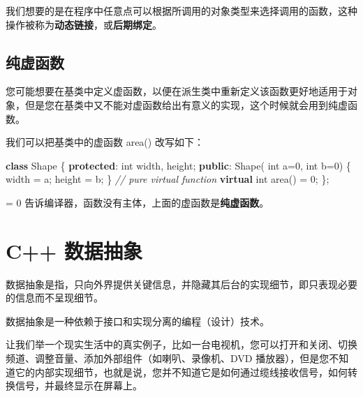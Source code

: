 \documentclass[
]{article}
\newenvironment{Shaded}{}{}
\newcommand{\CommentTok}[1]{\textcolor[rgb]{0.38,0.63,0.69}{\textit{#1}}}
\newcommand{\DataTypeTok}[1]{\textcolor[rgb]{0.56,0.13,0.00}{#1}}
\newcommand{\DecValTok}[1]{\textcolor[rgb]{0.25,0.63,0.44}{#1}}
\newcommand{\KeywordTok}[1]{\textcolor[rgb]{0.00,0.44,0.13}{\textbf{#1}}}
\newcommand{\NormalTok}[1]{#1}
\newcommand{\OperatorTok}[1]{\textcolor[rgb]{0.40,0.40,0.40}{#1}}
\begin{document}
我们想要的是在程序中任意点可以根据所调用的对象类型来选择调用的函数，这种操作被称为\textbf{动态链接}，或\textbf{后期绑定}。

\hypertarget{ux7eafux865aux51fdux6570}{%
\subsection{纯虚函数}\label{ux7eafux865aux51fdux6570}}

您可能想要在基类中定义虚函数，以便在派生类中重新定义该函数更好地适用于对象，但是您在基类中又不能对虚函数给出有意义的实现，这个时候就会用到纯虚函数。

我们可以把基类中的虚函数 area() 改写如下：

\begin{Shaded}
\begin{Highlighting}[]
\KeywordTok{class}\NormalTok{ Shape }\OperatorTok{\{}
   \KeywordTok{protected}\OperatorTok{:}
      \DataTypeTok{int}\NormalTok{ width}\OperatorTok{,}\NormalTok{ height}\OperatorTok{;}
   \KeywordTok{public}\OperatorTok{:}
\NormalTok{      Shape}\OperatorTok{(} \DataTypeTok{int}\NormalTok{ a}\OperatorTok{=}\DecValTok{0}\OperatorTok{,} \DataTypeTok{int}\NormalTok{ b}\OperatorTok{=}\DecValTok{0}\OperatorTok{)}
      \OperatorTok{\{}
\NormalTok{         width }\OperatorTok{=}\NormalTok{ a}\OperatorTok{;}
\NormalTok{         height }\OperatorTok{=}\NormalTok{ b}\OperatorTok{;}
      \OperatorTok{\}}
      \CommentTok{// pure virtual function}
      \KeywordTok{virtual} \DataTypeTok{int}\NormalTok{ area}\OperatorTok{()} \OperatorTok{=} \DecValTok{0}\OperatorTok{;}
\OperatorTok{\};}
\end{Highlighting}
\end{Shaded}

= 0 告诉编译器，函数没有主体，上面的虚函数是\textbf{纯虚函数}。

\hypertarget{c-ux6570ux636eux62bdux8c61}{%
\section{C++ 数据抽象}\label{c-ux6570ux636eux62bdux8c61}}

数据抽象是指，只向外界提供关键信息，并隐藏其后台的实现细节，即只表现必要的信息而不呈现细节。

数据抽象是一种依赖于接口和实现分离的编程（设计）技术。

让我们举一个现实生活中的真实例子，比如一台电视机，您可以打开和关闭、切换频道、调整音量、添加外部组件（如喇叭、录像机、DVD
播放器），但是您不知道它的内部实现细节，也就是说，您并不知道它是如何通过缆线接收信号，如何转换信号，并最终显示在屏幕上。
\end{document}
